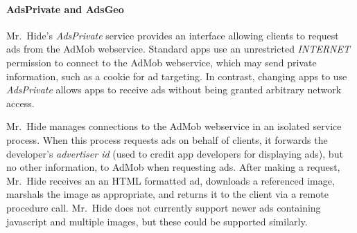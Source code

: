 \documentclass[preprint]{sig-alternate-10pt}
\newcommand{\lib}{Mr.\ Hide\xspace}
\newcommand{\perm}[1]{\textsf{\textit{#1}}}
\newcommand{\comment}[3][\color{red}]{}%
\newcommand{\jeff}[1]{\comment[\color{green}]{JSF}{#1}}
\newcommand{\polAdsBlindName}{\perm{AdsPrivate}\xspace}
\newcommand{\polAdsGeoName}{\perm{AdsGeo}\xspace}
\begin{document}

\paragraph*{AdsPrivate and AdsGeo}

\lib's \polAdsBlindName service provides an interface allowing clients 
to request ads from the AdMob webservice.  Standard apps use an
unrestricted \perm{INTERNET} permission to connect to the AdMob
webservice, which may send private information, such as a cookie 
for ad targeting.  In contrast, changing apps to use \polAdsBlindName allows apps to receive
ads without being granted arbitrary network access.


\lib manages connections to the AdMob webservice in an isolated
service process. When this process requests ads on behalf of clients,
it forwards the
developer's \emph{advertiser id} (used to credit app developers for displaying
ads), but no other information, to AdMob when requesting ads. After making
a request,
\lib receives an
an HTML formatted ad, downloads a referenced image,
marshals the image as
appropriate, and returns it to the client via a remote procedure call.
\lib does not currently support newer
ads containing javascript and multiple images, but these could be supported
similarly.
\end{document}
